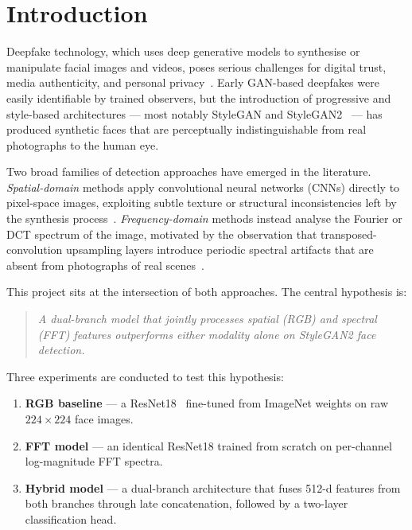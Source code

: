 \documentclass[12pt, a4paper]{article}
\begin{document}
\section{Introduction}
\label{sec:intro}

Deepfake technology, which uses deep generative models to synthesise or
manipulate facial images and videos, poses serious challenges for digital
trust, media authenticity, and personal privacy~\cite{goodfellow2014gan}.
Early GAN-based deepfakes were easily identifiable by trained observers, but
the introduction of progressive and style-based architectures — most notably
StyleGAN and StyleGAN2~\cite{karras2020stylegan2} — has produced synthetic
faces that are perceptually indistinguishable from real photographs to the
human eye.

Two broad families of detection approaches have emerged in the literature.
\emph{Spatial-domain} methods apply convolutional neural networks (CNNs)
directly to pixel-space images, exploiting subtle texture or structural
inconsistencies left by the synthesis
process~\cite{rossler2019faceforensics}.  \emph{Frequency-domain} methods
instead analyse the Fourier or DCT spectrum of the image, motivated by the
observation that transposed-convolution upsampling layers introduce periodic
spectral artifacts that are absent from photographs of real
scenes~\cite{frank2020frequency, dzanic2020fourier, durall2019unmasking}.

This project sits at the intersection of both approaches.  The central
hypothesis is:
\begin{quote}
\emph{A dual-branch model that jointly processes spatial (RGB) and spectral
(FFT) features outperforms either modality alone on StyleGAN2 face detection.}
\end{quote}

Three experiments are conducted to test this hypothesis:
\begin{enumerate}[leftmargin=1.8em]
  \item \textbf{RGB baseline} — a ResNet18~\cite{he2016resnet} fine-tuned from
    ImageNet weights on raw $224 \times 224$ face images.
  \item \textbf{FFT model} — an identical ResNet18 trained from scratch on
    per-channel log-magnitude FFT spectra.
  \item \textbf{Hybrid model} — a dual-branch architecture that fuses 512-d
    features from both branches through late concatenation, followed by a
    two-layer classification head.
\end{enumerate}
\end{document}

